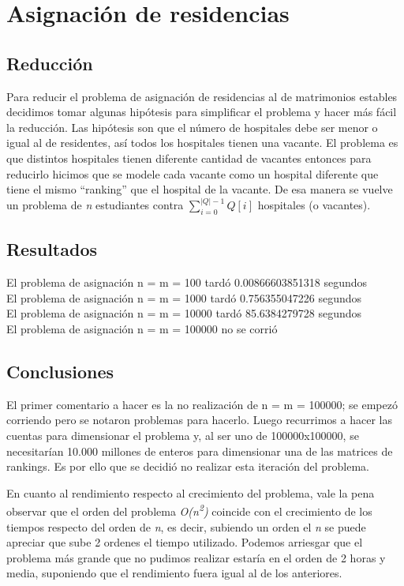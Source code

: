 \documentclass[a4paper,10pt]{article}
\begin{document}
\maketitle
\thispagestyle{empty}

\pagebreak 

\tableofcontents
\pagebreak

\clearpage
\section{Asignación de residencias}

\subsection{Reducción}
	Para reducir el problema de asignación de residencias al de matrimonios estables decidimos tomar algunas hipótesis para simplificar el problema y hacer más fácil la reducción. Las hipótesis son que el número de hospitales debe ser menor o igual al de residentes, así todos los hospitales tienen una vacante. El problema es que distintos hospitales tienen diferente cantidad de vacantes entonces para reducirlo hicimos que se modele cada vacante como un hospital diferente que tiene el mismo “ranking” que el hospital de la vacante. De esa manera se vuelve un problema de \emph{n} estudiantes contra $\sum_{i=0}^{|Q|-1} Q[i]$ hospitales (o vacantes).

\subsection{Resultados}
	\noindent El problema de asignación n = m = 100 tardó 0.00866603851318 segundos \\
	El problema de asignación n = m = 1000 tardó 0.756355047226 segundos \\
	El problema de asignación n = m = 10000 tardó 85.6384279728 segundos \\
	El problema de asignación n = m = 100000 no se corrió

\subsection{Conclusiones}
	El primer comentario a hacer es la no realización de n = m = 100000; se empezó corriendo pero se notaron problemas para hacerlo. Luego recurrimos a hacer las cuentas para dimensionar el problema y, al ser uno de 100000x100000, se necesitarían 10.000 millones de enteros para dimensionar una de las matrices de rankings. Es por ello que se decidió no realizar esta iteración del problema.
	\par En cuanto al rendimiento respecto al crecimiento del problema, vale la pena observar que el orden del problema \emph{O(n\textsuperscript{2})} coincide con el crecimiento de los tiempos respecto del orden de \emph{n}, es decir, subiendo un orden el \emph{n} se puede apreciar que sube 2 ordenes el tiempo utilizado. Podemos arriesgar que el problema más grande que no pudimos realizar estaría en el orden de 2 horas y media, suponiendo que el rendimiento fuera igual al de los anteriores.
\end{document}
